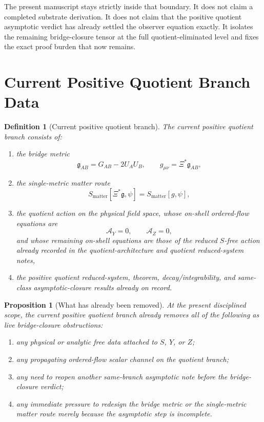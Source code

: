 \documentclass[11pt]{article}
\newcommand{\BridgeMetric}{\mathfrak{g}}
\newcommand{\AY}{\mathcal A_Y}
\newcommand{\AZ}{\mathcal A_Z}
\newtheorem{definition}{Definition}
\newtheorem{proposition}{Proposition}
\begin{document}
The present manuscript stays strictly inside that boundary. It does not claim a completed substrate derivation. It does not claim that the positive quotient asymptotic verdict has already settled the observer equation exactly. It isolates the remaining bridge-closure tensor at the full quotient-eliminated level and fixes the exact proof burden that now remains.

\section{Current Positive Quotient Branch Data}

\begin{definition}[Current positive quotient branch]
\label{def:branch}
The \emph{current positive quotient branch} consists of:
\begin{enumerate}
    \item the bridge metric
    \begin{equation}
    \BridgeMetric_{AB}=G_{AB}-2U_AU_B,
    \qquad
    g_{\mu\nu}=\Xi^*\BridgeMetric_{AB},
    \label{eq:bridge}
    \end{equation}
    \item the single-metric matter route
    \begin{equation}
    S_{\mathrm{matter}}[\Xi^*\BridgeMetric,\psi]
    =
    S_{\mathrm{matter}}[g,\psi],
    \label{eq:matterroute}
    \end{equation}
    \item the quotient action on the physical field space, whose on-shell ordered-flow equations are
    \begin{equation}
    \AY=0,
    \qquad
    \AZ=0,
    \label{eq:AYAZ}
    \end{equation}
    and whose remaining on-shell equations are those of the reduced \(S\)-free action already recorded in the quotient-architecture and quotient reduced-system notes,
    \item the positive quotient reduced-system, theorem, decay/integrability, and same-class asymptotic-closure results already on record.
\end{enumerate}
\end{definition}

\begin{proposition}[What has already been removed]
\label{prop:removed}
At the present disciplined scope, the current positive quotient branch already removes all of the following as live bridge-closure obstructions:
\begin{enumerate}
    \item any physical or analytic free data attached to \(S\), \(Y\), or \(Z\);
    \item any propagating ordered-flow scalar channel on the quotient branch;
    \item any need to reopen another same-branch asymptotic note before the bridge-closure verdict;
    \item any immediate pressure to redesign the bridge metric or the single-metric matter route merely because the asymptotic step is incomplete.
\end{enumerate}
\end{proposition}
\end{document}
